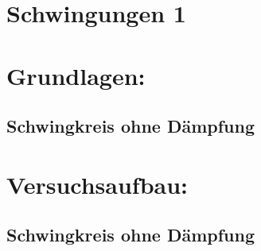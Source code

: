 \documentclass[12pt,a4paper]{article}
\begin{document}
\begin{multicols}{2}




%			




\section{Schwingungen 1}


\section{Grundlagen:}

\subsection{Schwingkreis ohne Dämpfung}


\section{Versuchsaufbau:}
\subsection{Schwingkreis ohne Dämpfung}



\end{multicols}
\end{document}
